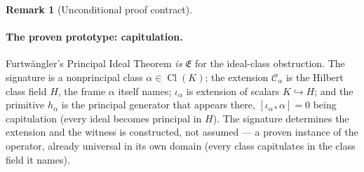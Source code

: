 \documentclass[11pt]{article}
\theoremstyle{definition}
\newtheorem{remark}[theorem]{Remark}
\begin{document}
\begin{remark}[Unconditional proof contract]
\begin{enumerate}
\paragraph{The proven prototype: capitulation.} Furtw\"angler's Principal Ideal Theorem \emph{is} $\mathfrak E$
for the ideal-class obstruction. The signature is a nonprincipal class $\alpha\in\operatorname{Cl}(K)$; the
extension $\mathcal C_\alpha$ is the Hilbert class field $H$, the frame $\alpha$ itself names; $\iota_\alpha$ is
extension of scalars $K\hookrightarrow H$; and the primitive $h_\alpha$ is the principal generator that appears
there, $[\iota_{\alpha*}\alpha]=0$ being capitulation (every ideal becomes principal in $H$). The signature
determines the extension and the witness is constructed, not assumed --- a proven instance of the operator,
already universal in its own domain (every class capitulates in the class field it names).


\end{enumerate}
\end{remark}
\end{document}
